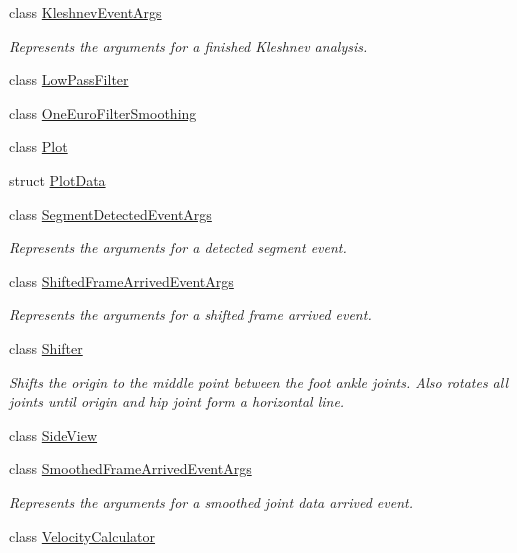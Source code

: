 \begin{DoxyCompactItemize}
class \hyperlink{class_rowing_monitor_1_1_model_1_1_kleshnev_event_args}{Kleshnev\+Event\+Args}
\begin{DoxyCompactList}\small\item\em Represents the arguments for a finished Kleshnev analysis. \end{DoxyCompactList}\item 
class \hyperlink{class_rowing_monitor_1_1_model_1_1_low_pass_filter}{Low\+Pass\+Filter}
\item 
class \hyperlink{class_rowing_monitor_1_1_model_1_1_one_euro_filter_smoothing}{One\+Euro\+Filter\+Smoothing}
\item 
class \hyperlink{class_rowing_monitor_1_1_model_1_1_plot}{Plot}
\item 
struct \hyperlink{struct_rowing_monitor_1_1_model_1_1_plot_data}{Plot\+Data}
\item 
class \hyperlink{class_rowing_monitor_1_1_model_1_1_segment_detected_event_args}{Segment\+Detected\+Event\+Args}
\begin{DoxyCompactList}\small\item\em Represents the arguments for a detected segment event. \end{DoxyCompactList}\item 
class \hyperlink{class_rowing_monitor_1_1_model_1_1_shifted_frame_arrived_event_args}{Shifted\+Frame\+Arrived\+Event\+Args}
\begin{DoxyCompactList}\small\item\em Represents the arguments for a shifted frame arrived event. \end{DoxyCompactList}\item 
class \hyperlink{class_rowing_monitor_1_1_model_1_1_shifter}{Shifter}
\begin{DoxyCompactList}\small\item\em Shifts the origin to the middle point between the foot ankle joints. Also rotates all joints until origin and hip joint form a horizontal line. \end{DoxyCompactList}\item 
class \hyperlink{class_rowing_monitor_1_1_model_1_1_side_view}{Side\+View}
\item 
class \hyperlink{class_rowing_monitor_1_1_model_1_1_smoothed_frame_arrived_event_args}{Smoothed\+Frame\+Arrived\+Event\+Args}
\begin{DoxyCompactList}\small\item\em Represents the arguments for a smoothed joint data arrived event. \end{DoxyCompactList}\item 
class \hyperlink{class_rowing_monitor_1_1_model_1_1_velocity_calculator}{Velocity\+Calculator}
\end{DoxyCompactItemize}
